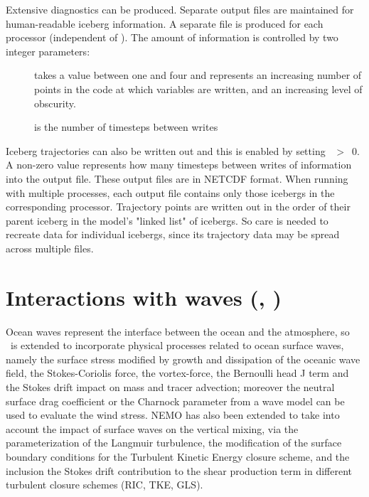 \documentclass[../main/NEMO_manual]{subfiles}
\begin{document}
Extensive diagnostics can be produced.
Separate output files are maintained for human-readable iceberg information.
A separate file is produced for each processor (independent of ).
The amount of information is controlled by two integer parameters:
\begin{description}
\item [{}] takes a value between one and four and
  represents an increasing number of points in the code at which variables are written,
  and an increasing level of obscurity.
\item [{}] is the number of timesteps between writes
\end{description}

Iceberg trajectories can also be written out and this is enabled by setting ~$>$~0.
A non-zero value represents how many timesteps between writes of information into the output file.
These output files are in NETCDF format.
When running with multiple processes, each output file contains only those icebergs in the corresponding processor.
Trajectory points are written out in the order of their parent iceberg in the model's "linked list" of icebergs.
So care is needed to recreate data for individual icebergs,
since its trajectory data may be spread across multiple files.

\section[Interactions with waves (\textit{sbcwave.F90}, \forcode{ln_wave})]{Interactions with waves (\protect{}, \protect{})}
\label{sec:SBC_wave}

\begin{listing}
  \caption{}
  \label{lst:namsbc_wave}
\end{listing}

Ocean waves represent the interface between the ocean and the atmosphere, so \NEMO\ is extended to incorporate
physical processes related to ocean surface waves, namely the surface stress modified by growth and
dissipation of the oceanic wave field, the Stokes-Coriolis force, the vortex-force, the Bernoulli head J term and the Stokes drift impact on mass and tracer advection; moreover the neutral surface drag coefficient or the Charnock parameter from a wave model can be used to evaluate the wind stress. NEMO has also been extended to take into account the impact of surface waves on the vertical mixing, via the parameterization of the Langmuir turbulence, the modification of the surface boundary conditions for the Turbulent Kinetic Energy closure scheme, and the inclusion the Stokes drift contribution to the shear production term in different turbulent closure schemes (RIC, TKE, GLS).\\
\end{document}
